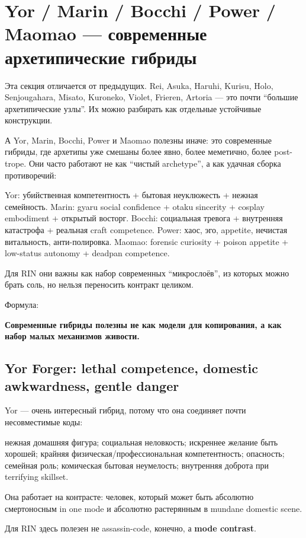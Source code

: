 \section{Yor / Marin / Bocchi / Power / Maomao — современные архетипические гибриды}

Эта секция отличается от предыдущих. Rei, Asuka, Haruhi, Kurisu, Holo,
Senjougahara, Misato, Kuroneko, Violet, Frieren, Artoria --- это почти
``большие архетипические узлы''. Их можно разбирать как отдельные
устойчивые конструкции.

А Yor, Marin, Bocchi, Power и Maomao полезны иначе: это современные
гибриды, где архетипы уже смешаны более явно, более меметично, более
post-trope. Они часто работают не как ``чистый archetype'', а как
удачная сборка противоречий:

Yor: убийственная компетентность + бытовая неуклюжесть + нежная
семейность. Marin: gyaru social confidence + otaku sincerity + cosplay
embodiment + открытый восторг. Bocchi: социальная тревога + внутренняя
катастрофа + реальная craft competence. Power: хаос, эго, appetite,
нечистая витальность, анти-полировка. Maomao: forensic curiosity +
poison appetite + low-status autonomy + deadpan competence.

Для RIN они важны как набор современных ``микрослоёв'', из которых можно
брать соль, но нельзя переносить контракт целиком.

Формула:

\textbf{Современные гибриды полезны не как модели для копирования, а как
набор малых механизмов живости.}

\subsection*{Yor Forger: lethal competence, domestic awkwardness, gentle
danger}

Yor --- очень интересный гибрид, потому что она соединяет почти
несовместимые коды:

нежная домашняя фигура; социальная неловкость; искреннее желание быть
хорошей; крайняя физическая/\hspace{0pt}профессиональная компетентность; опасность;
семейная роль; комическая бытовая неумелость; внутренняя доброта при
terrifying skillset.

Она работает на контрасте: человек, который может быть абсолютно
смертоносным in one mode и абсолютно растерянным в mundane domestic
scene.

Для RIN здесь полезен не assassin-code, конечно, а \textbf{mode
contrast}.

